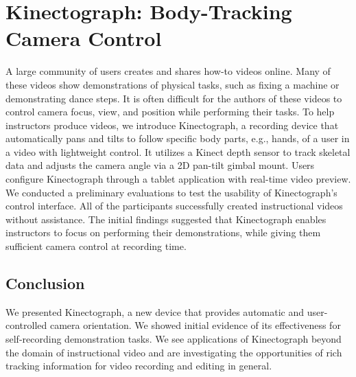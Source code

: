 \chapter{Kinectograph: Body-Tracking Camera Control}
\label{chapter_kinectograph}

A large community of users creates and shares how-to videos online. Many of these videos show demonstrations of physical tasks, such as fixing a machine or demonstrating dance steps. It is often difficult for the authors of these videos to control camera focus, view, and position while performing their tasks. To help instructors produce videos, we introduce Kinectograph, a recording device that automatically pans and tilts to follow specific body parts, e.g., hands, of a user in a video with lightweight control. It utilizes a Kinect depth sensor to track skeletal data and adjusts the camera angle via a 2D pan-tilt gimbal mount. Users configure Kinectograph through a tablet application with real-time video preview. We conducted a preliminary evaluations to test the usability of Kinectograph's control interface. All of the participants successfully created instructional videos without assistance. The initial findings suggested that Kinectograph enables instructors to focus on performing their demonstrations, while giving them sufficient camera control at recording time.











\section{Conclusion}
We presented Kinectograph, a new device that provides automatic and user-controlled camera orientation. We showed initial evidence of its effectiveness for self-recording demonstration tasks. We see applications of Kinectograph beyond the domain of instructional video and are investigating the opportunities of rich tracking information for video recording and editing in general.


